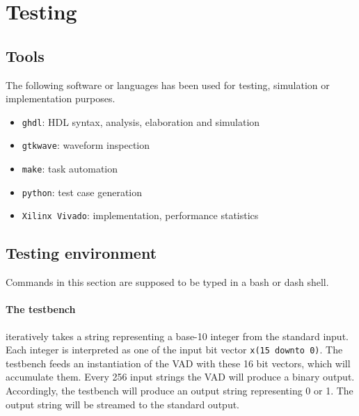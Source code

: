 \section{Testing}

\subsection{Tools}
The following software or languages has been used for testing, simulation or
implementation purposes.

\begin{itemize}
  \item \texttt{ghdl}: HDL syntax, analysis, elaboration and simulation
  \item \texttt{gtkwave}: waveform inspection
  \item \texttt{make}: task automation
  \item \texttt{python}: test case generation
  \item \texttt{Xilinx Vivado}: implementation, performance statistics
\end{itemize}

\subsection{Testing environment}

Commands in this section are supposed to be typed in a bash or dash shell.

\paragraph{The testbench} iteratively takes a string representing a base-10
integer from the standard input. Each integer is interpreted
as one of the input bit vector \texttt{x(15 downto 0)}. The testbench feeds an
instantiation of the VAD with these 16 bit vectors, which will accumulate them.
Every 256 input strings the VAD will produce a binary output. Accordingly,
the testbench will produce an output string representing 0 or 1. The output
string will be streamed to the standard output.

